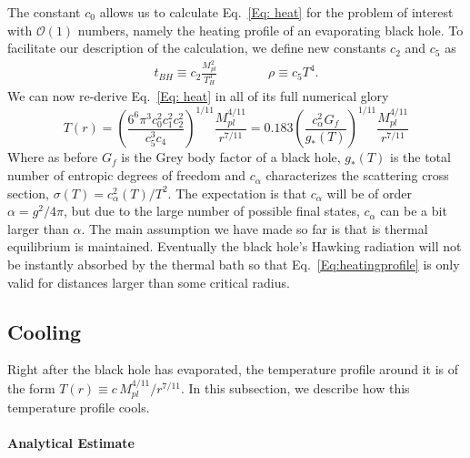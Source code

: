 \documentclass[superscriptaddress,groupedaddress,nofootnoteinbib,11pt]{article}
\newcommand{\mpl}{M_{pl}}
\def\l{\left(}
\def\r{\right)}
\begin{document}
The constant $c_0$ allows us to calculate
Eq.~\ref{Eq: heat} for the problem of interest with $\mathcal{O}(1)$ numbers, namely the heating profile of an evaporating black hole. To facilitate our description of the calculation, we define new constants $c_2$ and $c_5$ as 
\begin{equation}
    \begin{split}
        t_{BH}\equiv c_2\frac{\mpl^2}{T_{H}^3} \qquad \qquad 
        \rho\equiv c_5T^4 .
    \end{split}
\end{equation}
We can now re-derive Eq.~\ref{Eq: heat} in all of its full numerical glory
\begin{equation}\label{Eq:heatingprofile}
    T(r)=\l\frac{6^6\pi^3c_0^2c_1^2c_2^2}{c_5^3c_4}\r^{1/11}\frac{\mpl^{4/11}}{r^{7/11}}= 0.183 \l{\frac{c_{\alpha} ^2 G_f}{g_*(T)}}\r^{1/11}\frac{\mpl^{4/11}}{r^{7/11}}
\end{equation}
Where as before $G_f$ is the Grey body factor of a black hole, $g_*(T)$ is the total number of entropic degrees of freedom and $c_{\alpha}$ characterizes the scattering cross section, $\sigma(T)=c_{\alpha}^2(T)/T^2$.  The expectation is that $c_{\alpha}$ will be of order $\alpha = g^2/4 \pi$, but due to the large number of possible final states, $c_\alpha$ can be a bit larger than $\alpha$.
The main assumption we have made so far is that is thermal equilibrium is maintained.  Eventually the black hole's Hawking radiation will not be instantly absorbed by the thermal bath so that Eq.~\ref{Eq:heatingprofile} is only valid for distances larger than some critical radius.

\subsection{Cooling}

Right after the black hole has evaporated, the temperature profile around it is of the form $T(r) \equiv c \, \mpl^{4/11}/r^{7/11}$.  In this subsection, we describe how this temperature profile cools.  


\paragraph{Analytical Estimate}
\end{document}
